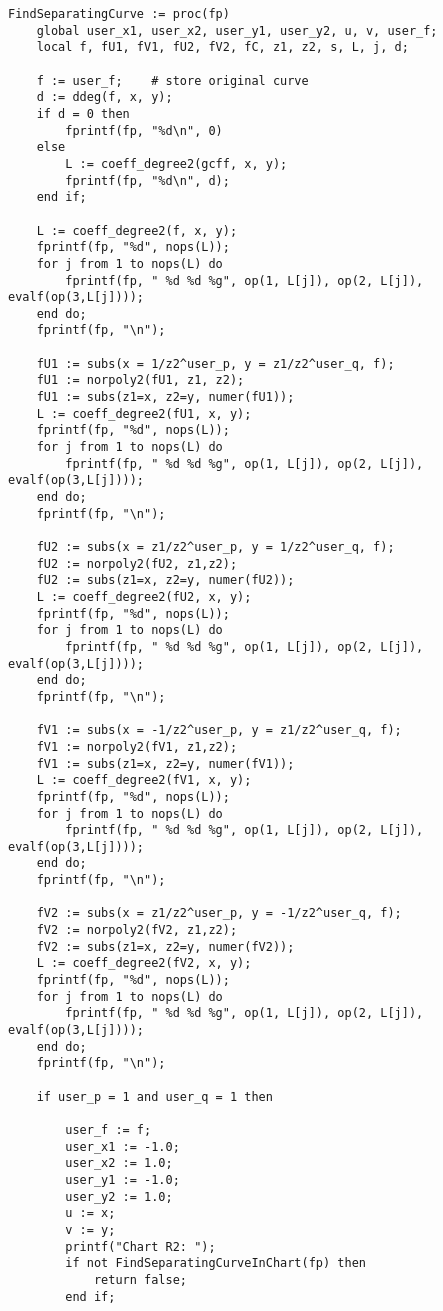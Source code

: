 \documentclass[a4paper,10pt]{article}
\begin{document}
\begin{lstlisting}[name=separatingcurves]
FindSeparatingCurve := proc(fp)
    global user_x1, user_x2, user_y1, user_y2, u, v, user_f;
    local f, fU1, fV1, fU2, fV2, fC, z1, z2, s, L, j, d;

    f := user_f;    # store original curve
    d := ddeg(f, x, y);
    if d = 0 then
        fprintf(fp, "%d\n", 0)
    else
        L := coeff_degree2(gcff, x, y);
        fprintf(fp, "%d\n", d);
    end if;

    L := coeff_degree2(f, x, y);
    fprintf(fp, "%d", nops(L));
    for j from 1 to nops(L) do
        fprintf(fp, " %d %d %g", op(1, L[j]), op(2, L[j]), evalf(op(3,L[j])));
    end do;
    fprintf(fp, "\n");

    fU1 := subs(x = 1/z2^user_p, y = z1/z2^user_q, f);
    fU1 := norpoly2(fU1, z1, z2);
    fU1 := subs(z1=x, z2=y, numer(fU1));
    L := coeff_degree2(fU1, x, y);
    fprintf(fp, "%d", nops(L));
    for j from 1 to nops(L) do
        fprintf(fp, " %d %d %g", op(1, L[j]), op(2, L[j]), evalf(op(3,L[j])));
    end do;
    fprintf(fp, "\n");

    fU2 := subs(x = z1/z2^user_p, y = 1/z2^user_q, f);
    fU2 := norpoly2(fU2, z1,z2);
    fU2 := subs(z1=x, z2=y, numer(fU2));
    L := coeff_degree2(fU2, x, y);
    fprintf(fp, "%d", nops(L));
    for j from 1 to nops(L) do
        fprintf(fp, " %d %d %g", op(1, L[j]), op(2, L[j]), evalf(op(3,L[j])));
    end do;
    fprintf(fp, "\n");

    fV1 := subs(x = -1/z2^user_p, y = z1/z2^user_q, f);
    fV1 := norpoly2(fV1, z1,z2);
    fV1 := subs(z1=x, z2=y, numer(fV1));
    L := coeff_degree2(fV1, x, y);
    fprintf(fp, "%d", nops(L));
    for j from 1 to nops(L) do
        fprintf(fp, " %d %d %g", op(1, L[j]), op(2, L[j]), evalf(op(3,L[j])));
    end do;
    fprintf(fp, "\n");

    fV2 := subs(x = z1/z2^user_p, y = -1/z2^user_q, f);
    fV2 := norpoly2(fV2, z1,z2);
    fV2 := subs(z1=x, z2=y, numer(fV2));
    L := coeff_degree2(fV2, x, y);
    fprintf(fp, "%d", nops(L));
    for j from 1 to nops(L) do
        fprintf(fp, " %d %d %g", op(1, L[j]), op(2, L[j]), evalf(op(3,L[j])));
    end do;
    fprintf(fp, "\n");

    if user_p = 1 and user_q = 1 then

        user_f := f;
        user_x1 := -1.0;
        user_x2 := 1.0;
        user_y1 := -1.0;
        user_y2 := 1.0;
        u := x;
        v := y;
        printf("Chart R2: ");
        if not FindSeparatingCurveInChart(fp) then
            return false;
        end if;


\end{lstlisting}
\end{document}
